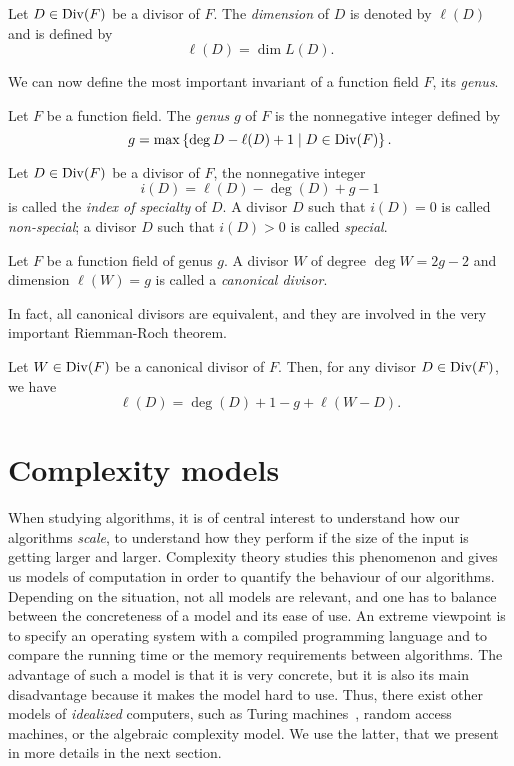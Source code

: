 \begin{defi}[Dimension]
  Let $D\in\operatorname{Div}(F)$ be a divisor of $F$. The \emph{dimension} of $D$ is denoted
  by $\ell(D)$ and is defined by
  \[
    \ell(D) = \dim L(D).
  \]
\end{defi}
We can now define the most important invariant of a function field $F$, its
\emph{genus}.
\begin{defi}[Genus]
  Let $F$ be a function field. The \emph{genus} $g$ of $F$ is the nonnegative
  integer defined by
  \[
    g = \max\left\{ \deg D-\ell(D)+1\mid D\in\operatorname{Div}(F) \right\}.
  \]
\end{defi}
\begin{defi}
  Let $D\in\operatorname{Div}(F)$ be a divisor of $F$, the nonnegative integer
  \[
    i(D) = \ell(D) - \deg(D) + g - 1
  \]
  is called the \emph{index of specialty} of $D$. A divisor $D$ such that
  $i(D)=0$ is called \emph{non-special}; a divisor $D$ such that $i(D)>0$ is
  called \emph{special}.
\end{defi}
\begin{defi}
  Let $F$ be a function field of genus $g$. A divisor $W$ of degree $\deg W = 2g-2$ and
  dimension $\ell(W) = g$ is called a \emph{canonical divisor}.
\end{defi}
In fact, all canonical divisors are equivalent, and they are involved in the
very important Riemman-Roch theorem.
\begin{thm}
  Let $W\in\operatorname{Div}(F)$ be a canonical divisor of $F$. Then, for any divisor
  $D\in\operatorname{Div}(F)$, we have
  \[
    \ell(D) = \deg(D) + 1 - g + \ell(W-D).
  \]
\end{thm}

\section{Complexity models}
\label{sec:complexity-models}

When studying algorithms, it is of central interest to understand how our algorithms
\emph{scale}, \ie to understand how they perform if the size of the input is
getting larger and larger. Complexity theory studies this phenomenon and gives us models
of computation in order to quantify the behaviour of our algorithms. Depending
on the situation, not all models are relevant, and one has to balance between
the concreteness of a model and its ease of use. An extreme viewpoint is to
specify an operating system with a compiled programming language and to compare
the running time or the memory requirements between algorithms. The advantage of
such a model is that it is very concrete, but it is also its main disadvantage
because it makes the model hard to use. Thus, there exist other models of
\emph{idealized} computers, such as Turing machines~\cite{Papadimitriou03},
random access machines, or the algebraic complexity model.
We use the latter, that we present in more details in the next section.


